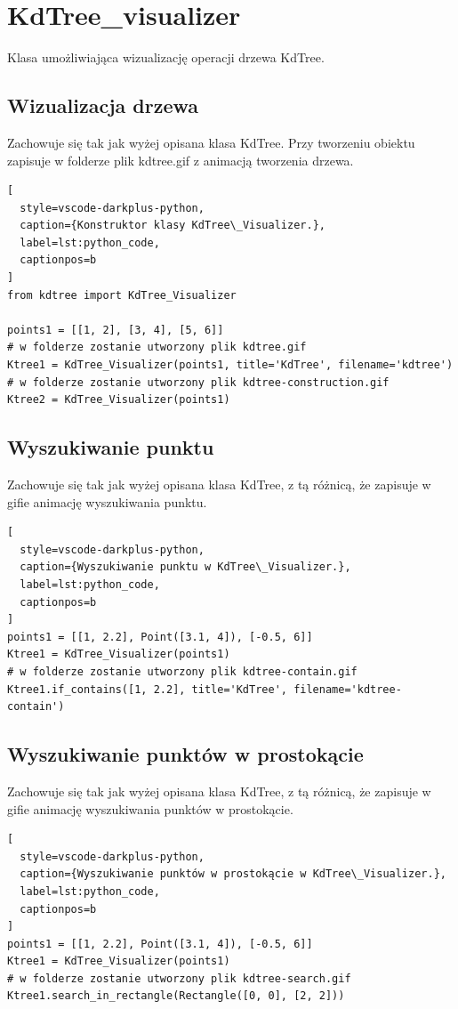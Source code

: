 \documentclass{lab}
\begin{document}
\section{KdTree\_visualizer}
Klasa umożliwiająca wizualizację operacji drzewa KdTree.
\subsection{Wizualizacja drzewa}
Zachowuje się tak jak wyżej opisana klasa KdTree. Przy tworzeniu obiektu zapisuje w folderze plik kdtree.gif z animacją tworzenia drzewa.
\begin{lstlisting}[
  style=vscode-darkplus-python,
  caption={Konstruktor klasy KdTree\_Visualizer.},
  label=lst:python_code,
  captionpos=b
]
from kdtree import KdTree_Visualizer

points1 = [[1, 2], [3, 4], [5, 6]]
# w folderze zostanie utworzony plik kdtree.gif
Ktree1 = KdTree_Visualizer(points1, title='KdTree', filename='kdtree')
# w folderze zostanie utworzony plik kdtree-construction.gif
Ktree2 = KdTree_Visualizer(points1)
\end{lstlisting}

\subsection{Wyszukiwanie punktu}
Zachowuje się tak jak wyżej opisana klasa KdTree, z tą różnicą, że zapisuje w gifie animację wyszukiwania punktu.
\begin{lstlisting}[
  style=vscode-darkplus-python,
  caption={Wyszukiwanie punktu w KdTree\_Visualizer.},
  label=lst:python_code,
  captionpos=b
]
points1 = [[1, 2.2], Point([3.1, 4]), [-0.5, 6]]
Ktree1 = KdTree_Visualizer(points1)
# w folderze zostanie utworzony plik kdtree-contain.gif
Ktree1.if_contains([1, 2.2], title='KdTree', filename='kdtree-contain')
\end{lstlisting}

\subsection{Wyszukiwanie punktów w prostokącie}
Zachowuje się tak jak wyżej opisana klasa KdTree, z tą różnicą, że zapisuje w gifie animację wyszukiwania punktów w prostokącie.
\begin{lstlisting}[
  style=vscode-darkplus-python,
  caption={Wyszukiwanie punktów w prostokącie w KdTree\_Visualizer.},
  label=lst:python_code,
  captionpos=b
]
points1 = [[1, 2.2], Point([3.1, 4]), [-0.5, 6]]
Ktree1 = KdTree_Visualizer(points1)
# w folderze zostanie utworzony plik kdtree-search.gif
Ktree1.search_in_rectangle(Rectangle([0, 0], [2, 2]))
\end{lstlisting}
\end{document}
